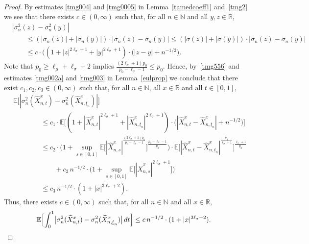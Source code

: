 \documentclass[11pt]{amsart}
\newcommand{\R}{{\mathbb R}}
\newcommand{\N}{{\mathbb N}}
\newcommand{\EE}{{\mathbb E}}
\newcommand{\eul}{{\widehat X}}
\newcommand{\utn}{\underline {t}_n}
\theoremstyle{plain}
\theoremstyle{definition}
\begin{document}
\begin{proof}
By estimates \eqref{tmg004} and \eqref{tmg0005} in Lemma~\ref{tamedcoeff1} and~\eqref{tmg2} we see that there exists $c\in (0,\infty)$ such that, for all $n\in\N$ and all $y,z\in\R$,
\begin{equation}\label{tmg556}
\begin{aligned}
& |\sigma_n^2(z)-\sigma_n^2(y)|\\
& \qquad \le (|\sigma_n(z)|+|\sigma_n(y)|)\cdot |\sigma_n(z)-\sigma_n(y)|\le (|\sigma(z)|+|\sigma(y)|)\cdot |\sigma_n(z)-\sigma_n(y)|\\
& \qquad \le c\cdot \bigl((1 + |z|^{2\ell_\sigma+1} + |y|^{2\ell_\sigma+1}) \cdot \bigl(|z-y|+n^{-1/2}\bigr).
\end{aligned}
\end{equation}
Note  that $p_0\ge  \ell_\mu+\ell_\sigma+2$ implies $\tfrac{(2\ell_\sigma+1)p_0}{p_0-\ell_\sigma-1}\leq p_0$. Hence,
by~\eqref{tmg556} and estimates \eqref{tmg002a}  and \eqref{tmg003} in Lemma~\ref{eulprop}  we conclude that there exist $c_1, c_2, c_3\in(0, \infty)$ such that, for all $n\in\N$, all $x\in\R$ and all $t\in[0,1]$,
\begin{align*}
& \EE\bigl[|\sigma_n^2(\eul_{n,t}^x)-\sigma_n^2(\eul_{n,\utn}^x)|\bigr]\\
&\qquad\qquad  \le c_1\cdot \EE\bigl[(1 + |\eul_{n,t}^x|^{2\ell_\sigma+1} + |\eul_{n,\utn}^x|^{2\ell_\sigma+1}) \cdot\bigl(|\eul_{n,t}^x-\eul_{n,\utn}^x|+n^{-1/2}\bigr)\bigr]\\
& \qquad\qquad \le c_2\cdot \bigl(1 + \sup_{s\in[0,1]}\EE\bigl[|\eul_{n,s}^x|^{\frac{(2\ell_\sigma+1)p_0}{p_0-\ell_\sigma-1}}\bigr]^{\frac{p_0-\ell_\sigma-1}{p_0}}\bigr) \cdot \EE\bigl[ |\eul_{n,t}^x-\eul_{n,\utn}^x|^{\frac{p_0}{\ell_\sigma+1}}\bigr]^{\frac{\ell_\sigma+1}{p_0}}\\
& \qquad\qquad \qquad + c_2 \,n^{-1/2}\cdot \bigl(1 + \sup_{s\in[0,1]}\EE\bigl[|\eul_{n,s}^x|^{2\ell_\sigma+1}\bigr]\bigr)\\
&\qquad\qquad  \le c_3\,n^{-1/2}\cdot (1+|x|^{3\ell_\sigma+2}).
\end{align*}
Thus, there exists $c\in (0,\infty)$ such that, for all $n\in\N$ and all $x\in\R$,
\begin{equation}\label{local3}
\begin{aligned}
  \EE\Bigl[\int_0^1\bigl|\sigma_n^2(\eul^x_{n,t})-\sigma_n^2(\eul^x_{n,\utn})\bigr|\, dt \Bigr]
 & \le c\,n^{-1/2}\cdot (1+|x|^{3\ell_\sigma+2}).
\end{aligned}
\end{equation}


\end{proof}
\end{document}
